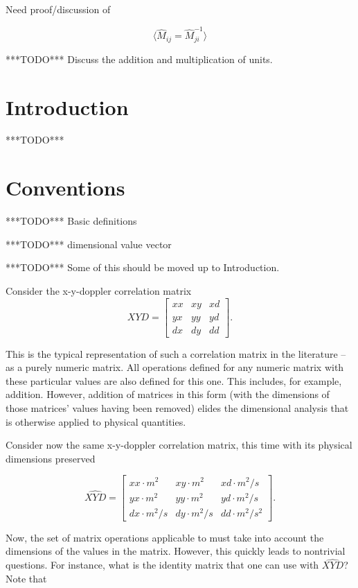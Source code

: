 \documentclass[10pt,letterpaper]{article}
\author{T. Zachary Laine}
\numberwithin{equation}{section}
\begin{document}
Need proof/discussion of

\[ \langle \hat{M}_{ij} = \hat{M}^{-1}_{ji}\rangle \]

***TODO*** Discuss the addition and multiplication of units.

\section{Introduction}

***TODO***

\section{Conventions}

***TODO*** Basic definitions

***TODO*** dimensional value vector

***TODO*** Some of this should be moved up to Introduction.

Consider the x-y-doppler correlation matrix
\[XYD = \left[ \begin{matrix}
xx & xy & xd \\ yx & yy & yd \\ dx & dy & dd
\end{matrix} \right]. \]

This is the typical representation of such a correlation matrix in the
literature – as a purely numeric matrix.  All operations defined for
any numeric matrix with these particular values are also defined for
this one.  This includes, for example, addition.  However, addition of
matrices in this form (with the dimensions of those matrices' values
having been removed) elides the dimensional analysis that is otherwise
applied to physical quantities.

Consider now the same x-y-doppler correlation matrix, this time with
its physical dimensions preserved

\[ \widehat{XYD}= \left[ \begin{matrix}
  xx \cdot m^2 & xy \cdot m^2 & xd \cdot m^2/s \\
  yx \cdot m^2 & yy \cdot m^2 & yd \cdot m^2/s \\
  dx \cdot m^2/s & dy \cdot m^2/s & dd \cdot m^2/s^2
\end{matrix} \right]. \]

Now, the set of matrix operations applicable to must take into account
the dimensions of the values in the matrix.  However, this quickly
leads to nontrivial questions.  For instance, what is the identity
matrix that one can use with $\widehat{XYD}$?  Note that
\end{document}
